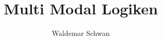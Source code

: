 \documentclass[a4paper]{article}
\title{Multi Modal Logiken}
\author{Waldemar Schwan}
\begin{document}
	

	
	
	
%

\tableofcontents
\newpage






\begin{small}
	\renewcommand{\baselinestretch}{0.9}\normalsize
	
	
\end{small}

\renewcommand{\baselinestretch}{1.1}\normalsize

\end{document}
